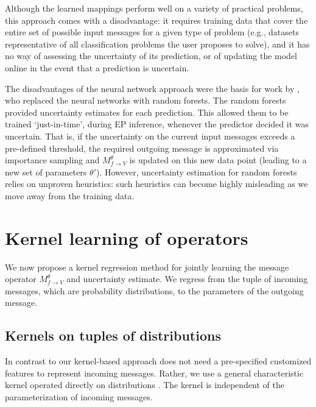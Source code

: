 \documentclass[english]{article}
\theoremstyle{plain}
\theoremstyle{plain}
\newcommand{\factor}{f}				%
\newcommand{\outV}{V}                         %
\newcommand{\approxMsg}[3]{M_{#1 \rightarrow #2}^{#3}}			%
\begin{document}
Although the learned mappings perform well on a variety of practical problems, 
this approach comes with a disadvantage: it requires training data
that cover the entire set of possible input messages for a given type of problem (e.g., datasets
representative of all classification problems the user proposes to solve),
and it has no way of assessing the uncertainty of its prediction, or of updating
the model online in the event that a prediction is uncertain.


The disadvantages of the neural network approach were the basis for work by
\citet{Eslami2014}, who replaced the neural networks with random forests.
The random forests  provided uncertainty estimates for each prediction. This
allowed them to be trained `just-in-time', during EP inference, whenever the
predictor decided it was uncertain. That is, if the uncertainty on the current
input messages exceeds a pre-defined threshold, the required outgoing message
is approximated via importance sampling  and
$\approxMsg{\factor}{\outV}{\theta}$ is updated on this new data point (leading
to a new set of parameters  $\theta'$). 
However, uncertainty estimation for random forests relies on unproven
heuristics: such heuristics can become highly misleading as we move away from
the training data.


\section{Kernel learning of operators}\label{sec:Online}

We now propose a kernel regression method for jointly learning the message operator $\approxMsg{\factor}{\outV}{\theta}$ and
uncertainty estimate. We regress from the tuple of incoming messages, which
are probability distributions, to the parameters of the outgoing message. 

\subsection{Kernels on tuples of distributions}\label{sec:kernelsOnDistributions}

In contrast to \citet{Eslami2014,Heess2013} our kernel-based approach does not
need a pre-specified customized features to represent incoming messages.
Rather, we use a general characteristic kernel operated directly on distributions
\citep[eq.  9]{Christmann2010}. The kernel is independent of the parameterization of 
incoming messages. 
\end{document}
